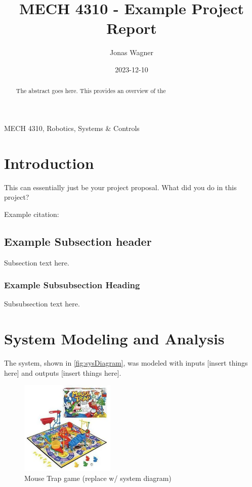 \documentclass[conference,onecolumn]{IEEEtran}
\title{MECH 4310 - Example Project Report}
\author{Jonas Wagner}
\date{2023-12-10}
\begin{document}
\maketitle

\begin{abstract}
    The abstract goes here.
    This provides an overview of the 
\end{abstract}

\begin{IEEEkeywords}
MECH 4310, Robotics, Systems \& Controls
\end{IEEEkeywords}

\section{Introduction}
This can essentially just be your project proposal.
What did you do in this project?


Example citation:
\cite{classTextbook}


\subsection{Example Subsection header}
Subsection text here.

\subsubsection{Example Subsubsection Heading}
Subsubsection text here.

\section{System Modeling and Analysis}

The system, shown in \autoref{fig:sysDiagram}, was modeled with inputs [insert things here] and outputs [insert things here].

\begin{figure}[h]
    \centering
    \includegraphics[width=0.4\textwidth]{figs/mouseTrap.png}
    \caption{Mouse Trap game (replace w/ system diagram)}
    \label{fig:sysDiagram}
\end{figure}
\end{document}
